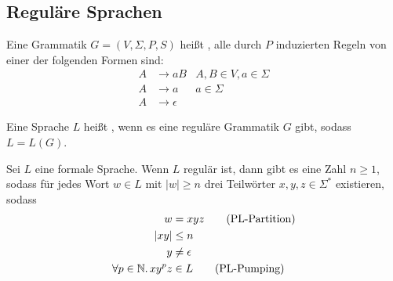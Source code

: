 \subsection{Reguläre Sprachen}

\begin{definition}
	Eine Grammatik $G = (V, \Sigma, P, S)$ heißt , alle durch
	$P$ induzierten Regeln von einer der folgenden Formen sind:
	\begin{align*}
		A & \rightarrow aB & A,B \in V, a \in \Sigma \\
		A & \rightarrow a & a \in \Sigma \\
		A & \rightarrow \epsilon
	\end{align*}
\end{definition}

\begin{definition}
	Eine Sprache $L$ heißt , wenn es eine reguläre Grammatik
	$G$ gibt, sodass $L = L(G)$.
\end{definition}

\begin{theorem}
	Sei $L$ eine formale Sprache.
	Wenn $L$ regulär ist, dann gibt es eine Zahl $n \geq 1$, sodass für
	jedes Wort $w \in L$ mit $|w| \geq n$ drei Teilwörter $x,y,z \in
	\Sigma^*$ existieren, sodass
	\begin{align}
		w & = xyz \tag{PL-Partition}\label{thinf:reg:pl-partition} \\
		|xy| & \leq n \label{thinf:reg:pl-beginning} \\
		y & \neq \epsilon \label{thinf:reg:pl-midnotempty} \\
		\forall p \in \mathbb{N}.\, xy^pz & \in L
		\tag{PL-Pumping}\label{thinf:reg:pl-pumping}
	\end{align}
\end{theorem}

